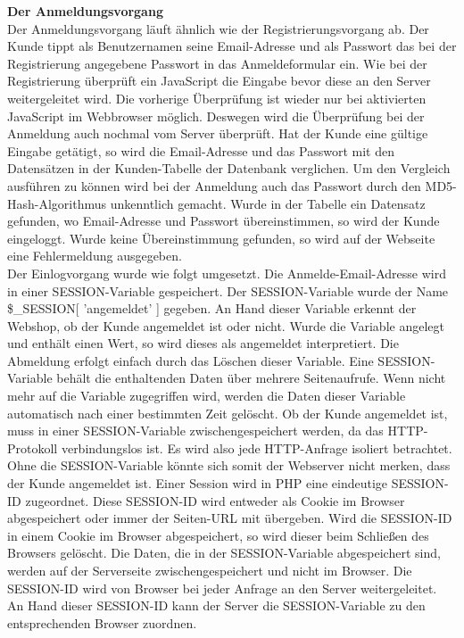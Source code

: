 \textbf{Der Anmeldungsvorgang}\\
Der Anmeldungsvorgang läuft ähnlich wie der Registrierungsvorgang ab. Der Kunde tippt als Benutzernamen seine Email-Adresse und als Passwort das bei der Registrierung angegebene Passwort in das Anmeldeformular ein. Wie bei der Registrierung überprüft ein JavaScript die Eingabe bevor diese an den Server weitergeleitet wird. Die vorherige Überprüfung ist wieder nur bei aktivierten JavaScript im Webbrowser möglich. Deswegen wird die Überprüfung bei der Anmeldung auch nochmal vom Server überprüft. Hat der Kunde eine gültige Eingabe getätigt, so wird die Email-Adresse und das Passwort mit den Datensätzen in der Kunden-Tabelle der Datenbank verglichen. Um den Vergleich ausführen zu können wird bei der Anmeldung auch das Passwort durch den  \glqq MD5-Hash-Algorithmus\grqq{} unkenntlich gemacht. Wurde in der Tabelle ein Datensatz gefunden, wo Email-Adresse und Passwort übereinstimmen, so wird der Kunde eingeloggt. Wurde keine Übereinstimmung gefunden, so wird auf der Webseite eine Fehlermeldung ausgegeben.\\ 
Der Einlogvorgang wurde wie folgt umgesetzt. Die Anmelde-Email-Adresse wird in einer SESSION-Variable gespeichert. Der SESSION-Variable wurde der Name \glqq \$\_SESSION[ 'angemeldet' ]\grqq{} gegeben. An Hand dieser Variable erkennt der Webshop, ob der Kunde angemeldet ist oder nicht. Wurde die Variable angelegt und enthält einen Wert, so wird dieses als angemeldet interpretiert. Die Abmeldung erfolgt einfach durch das Löschen dieser Variable. Eine SESSION-Variable behält die enthaltenden Daten über mehrere Seitenaufrufe. Wenn nicht mehr auf die Variable zugegriffen wird, werden die Daten dieser Variable automatisch nach einer bestimmten Zeit gelöscht. Ob der Kunde angemeldet ist, muss in einer SESSION-Variable zwischengespeichert werden, da das HTTP-Protokoll verbindungslos ist. Es wird also jede HTTP-Anfrage isoliert betrachtet. Ohne die SESSION-Variable könnte sich somit der Webserver nicht merken, dass der Kunde angemeldet ist. Einer Session wird in PHP eine eindeutige \glqq SESSION-ID\grqq{} zugeordnet. Diese SESSION-ID wird entweder als Cookie im Browser abgespeichert oder immer der Seiten-URL mit übergeben. Wird die SESSION-ID in einem Cookie im Browser abgespeichert, so wird dieser beim Schließen des Browsers gelöscht. Die Daten, die in der SESSION-Variable abgespeichert sind, werden auf der Serverseite zwischengespeichert und nicht im Browser. Die SESSION-ID wird von Browser bei jeder Anfrage an den Server weitergeleitet. An Hand dieser SESSION-ID kann der Server die SESSION-Variable zu den entsprechenden Browser zuordnen.\\

